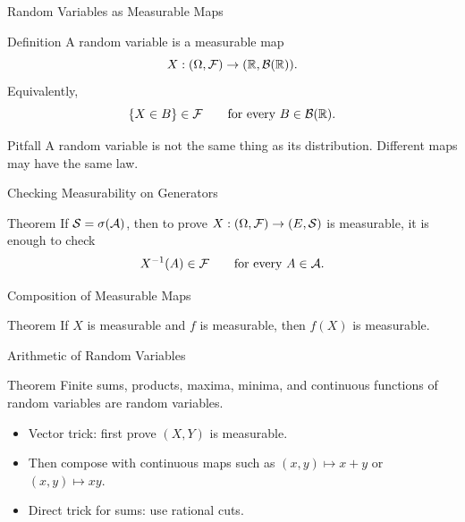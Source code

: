 \begin{frame}{Random Variables as Measurable Maps}
  \begin{block}{Definition}
    A random variable is a measurable map
    \[
      X:(\Omega,\mathcal{F})\to(\mathbb{R},\mathcal{B}(\mathbb{R})).
    \]
    Equivalently,
    \[
      \{X\in B\}\in\mathcal{F}\qquad\text{for every }B\in\mathcal{B}(\mathbb{R}).
    \]
  \end{block}
  \begin{alertblock}{Pitfall}
    A random variable is not the same thing as its distribution. Different maps may have the same law.
  \end{alertblock}
\end{frame}

\begin{frame}{Checking Measurability on Generators}
  \begin{block}{Theorem}
    If $\mathcal{S}=\sigma(\mathcal{A})$, then to prove $X:(\Omega,\mathcal{F})\to(E,\mathcal{S})$ is measurable, it is enough to check
    \[
      X^{-1}(A)\in\mathcal{F}\qquad\text{for every }A\in\mathcal{A}.
    \]
  \end{block}
\end{frame}

\begin{frame}{Composition of Measurable Maps}
  \begin{block}{Theorem}
    If $X$ is measurable and $f$ is measurable, then $f(X)$ is measurable.
  \end{block}
\end{frame}

\begin{frame}{Arithmetic of Random Variables}
  \begin{block}{Theorem}
    Finite sums, products, maxima, minima, and continuous functions of random variables are random variables.
  \end{block}
  \begin{itemize}
    \item Vector trick: first prove $(X,Y)$ is measurable.
    \item Then compose with continuous maps such as $(x,y)\mapsto x+y$ or $(x,y)\mapsto xy$.
    \item Direct trick for sums: use rational cuts.
  \end{itemize}
\end{frame}

